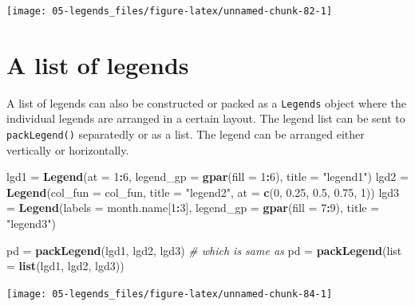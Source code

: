 \documentclass[]{book}
\newenvironment{Shaded}{\begin{snugshade}}{\end{snugshade}}
\newcommand{\KeywordTok}[1]{\textcolor[rgb]{0.13,0.29,0.53}{\textbf{#1}}}
\newcommand{\DataTypeTok}[1]{\textcolor[rgb]{0.13,0.29,0.53}{#1}}
\newcommand{\DecValTok}[1]{\textcolor[rgb]{0.00,0.00,0.81}{#1}}
\newcommand{\FloatTok}[1]{\textcolor[rgb]{0.00,0.00,0.81}{#1}}
\newcommand{\StringTok}[1]{\textcolor[rgb]{0.31,0.60,0.02}{#1}}
\newcommand{\CommentTok}[1]{\textcolor[rgb]{0.56,0.35,0.01}{\textit{#1}}}
\newcommand{\OperatorTok}[1]{\textcolor[rgb]{0.81,0.36,0.00}{\textbf{#1}}}
\newcommand{\NormalTok}[1]{#1}
\theoremstyle{definition}
\theoremstyle{definition}
\theoremstyle{definition}
\theoremstyle{remark}
\begin{document}
\begin{center}\texttt{[image: 05-legends\_files/figure-latex/unnamed-chunk-82-1]} \end{center}

\section{A list of legends}\label{a-list-of-legends}

A list of legends can also be constructed or packed as a
\texttt{Legends} object where the individual legends are arranged in a
certain layout. The legend list can be sent to \texttt{packLegend()}
separatedly or as a list. The legend can be arranged either vertically
or horizontally.

\begin{Shaded}
\begin{Highlighting}[]
\NormalTok{lgd1 =}\StringTok{ }\KeywordTok{Legend}\NormalTok{(}\DataTypeTok{at =} \DecValTok{1}\OperatorTok{:}\DecValTok{6}\NormalTok{, }\DataTypeTok{legend_gp =} \KeywordTok{gpar}\NormalTok{(}\DataTypeTok{fill =} \DecValTok{1}\OperatorTok{:}\DecValTok{6}\NormalTok{), }\DataTypeTok{title =} \StringTok{"legend1"}\NormalTok{)}
\NormalTok{lgd2 =}\StringTok{ }\KeywordTok{Legend}\NormalTok{(}\DataTypeTok{col_fun =}\NormalTok{ col_fun, }\DataTypeTok{title =} \StringTok{"legend2"}\NormalTok{, }\DataTypeTok{at =} \KeywordTok{c}\NormalTok{(}\DecValTok{0}\NormalTok{, }\FloatTok{0.25}\NormalTok{, }\FloatTok{0.5}\NormalTok{, }\FloatTok{0.75}\NormalTok{, }\DecValTok{1}\NormalTok{))}
\NormalTok{lgd3 =}\StringTok{ }\KeywordTok{Legend}\NormalTok{(}\DataTypeTok{labels =}\NormalTok{ month.name[}\DecValTok{1}\OperatorTok{:}\DecValTok{3}\NormalTok{], }\DataTypeTok{legend_gp =} \KeywordTok{gpar}\NormalTok{(}\DataTypeTok{fill =} \DecValTok{7}\OperatorTok{:}\DecValTok{9}\NormalTok{), }\DataTypeTok{title =} \StringTok{"legend3"}\NormalTok{)}

\NormalTok{pd =}\StringTok{ }\KeywordTok{packLegend}\NormalTok{(lgd1, lgd2, lgd3)}
\CommentTok{# which is same as }
\NormalTok{pd =}\StringTok{ }\KeywordTok{packLegend}\NormalTok{(}\DataTypeTok{list =} \KeywordTok{list}\NormalTok{(lgd1, lgd2, lgd3))}
\end{Highlighting}
\end{Shaded}

\begin{center}\texttt{[image: 05-legends\_files/figure-latex/unnamed-chunk-84-1]} \end{center}
\end{document}
